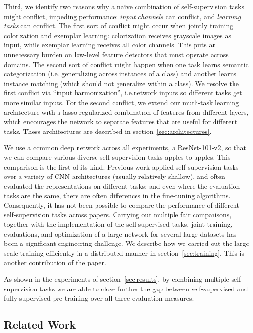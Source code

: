 \documentclass[10pt,twocolumn,letterpaper]{article}
\begin{document}
Third, we identify two reasons why a na{\"i}ve combination of self-supervision tasks might conflict, impeding performance: \textit{input channels} can conflict, and \textit{learning tasks} can conflict.
The first sort of conflict might occur when jointly training colorization and exemplar learning: colorization receives grayscale images as input, while exemplar learning receives all color channels.
This puts an unnecessary burden on low-level feature detectors that must operate across domains.
The second sort of conflict might happen when one task learns semantic categorization (i.e. generalizing across instances of a class) and another learns instance matching (which should not generalize within a class).
We resolve the first conflict via ``input harmonization'', i.e.\modifying network inputs so different tasks get more similar inputs.  
For the second conflict, we extend our mutli-task learning architecture with a lasso-regularized combination of features from different layers, which encourages the network to separate features that are useful for different tasks.
These architectures are described in section~\ref{sec:architectures}.

We use a common deep network across all experiments, a ResNet-101-v2, so that we can compare various diverse self-supervision tasks apples-to-apples.
This comparison is the first of its kind.  Previous work applied
self-supervision tasks over a variety of CNN architectures (usually
relatively shallow), and often evaluated the representations on
different tasks; and even where the evaluation tasks are the same, there
are often differences in the fine-tuning algorithms. Consequently, it has not been possible to 
compare the performance of different self-supervision tasks across papers.
Carrying out multiple fair comparisons, together with the implementation
of the self-supervised tasks, joint training, evaluations, and
optimization of a large network for several large datasets has been a
significant engineering challenge. We describe how we carried out the
large scale training efficiently in a distributed manner
in section~\ref{sec:training}. This is another contribution of the paper.

As shown in the experiments of section~\ref{sec:results}, by combining multiple
self-supervision tasks we are able to close further the gap between self-supervised and fully supervised 
pre-training over all three evaluation measures.


\subsection{Related Work}
\end{document}
